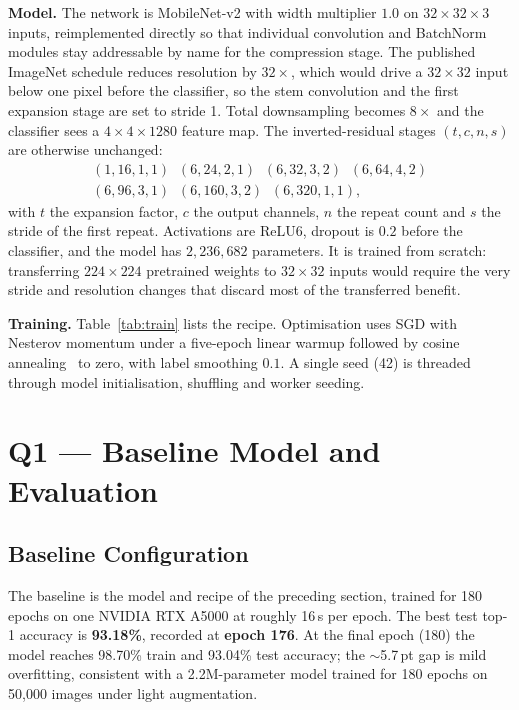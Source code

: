 \documentclass[10pt,a4paper]{article}
\begin{document}
\textbf{Model.} The network is MobileNet-v2 with width multiplier $1.0$ on
$32\times32\times3$ inputs, reimplemented directly so that individual convolution
and BatchNorm modules stay addressable by name for the compression stage. The
published ImageNet schedule reduces resolution by $32\times$, which would drive a
$32\times32$ input below one pixel before the classifier, so the stem convolution
and the first expansion stage are set to stride 1. Total downsampling becomes
$8\times$ and the classifier sees a $4\times4\times1280$ feature map. The inverted-residual stages
$(t,c,n,s)$ are otherwise unchanged:
\[
\begin{array}{l}
(1,16,1,1)\;\; (6,24,2,1)\;\; (6,32,3,2)\;\; (6,64,4,2)\\[2pt]
(6,96,3,1)\;\; (6,160,3,2)\;\; (6,320,1,1),
\end{array}
\]
with $t$ the expansion factor, $c$ the output channels, $n$ the repeat count and
$s$ the stride of the first repeat. Activations are ReLU6, dropout is $0.2$
before the classifier, and the model has $2{,}236{,}682$ parameters. It is trained
from scratch: transferring $224\times224$ pretrained weights to $32\times32$
inputs would require the very stride and resolution changes that discard most of
the transferred benefit.

\textbf{Training.} Table~\ref{tab:train} lists the recipe. Optimisation uses SGD
with Nesterov momentum under a five-epoch linear warmup followed by cosine
annealing~\cite{loshchilov2017sgdr} to zero, with label smoothing $0.1$. A single
seed (42) is threaded through model initialisation, shuffling and worker seeding.

\TableTraining

\section{Q1 --- Baseline Model and Evaluation}

\subsection{Baseline Configuration}
The baseline is the model and recipe of the preceding section, trained for 180
epochs on one NVIDIA RTX A5000 at roughly 16\,s per epoch. The best test top-1
accuracy is \textbf{93.18\%}, recorded at \textbf{epoch 176}. At the final epoch
(180) the model reaches 98.70\% train and 93.04\% test accuracy; the $\sim$5.7\,pt
gap is mild overfitting, consistent with a 2.2M-parameter model trained for 180
epochs on 50{,}000 images under light augmentation.
\end{document}
